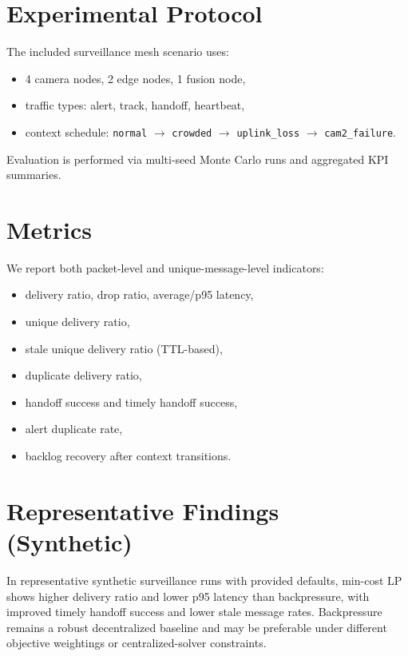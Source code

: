 \documentclass[11pt]{article}
\begin{document}
\section{Experimental Protocol}
The included surveillance mesh scenario uses:
\begin{itemize}[leftmargin=1.5em]
  \item 4 camera nodes, 2 edge nodes, 1 fusion node,
  \item traffic types: alert, track, handoff, heartbeat,
  \item context schedule: \texttt{normal} $\rightarrow$ \texttt{crowded} $\rightarrow$ \texttt{uplink\_loss} $\rightarrow$ \texttt{cam2\_failure}.
\end{itemize}

Evaluation is performed via multi-seed Monte Carlo runs and aggregated KPI summaries.

\section{Metrics}
We report both packet-level and unique-message-level indicators:
\begin{itemize}[leftmargin=1.5em]
  \item delivery ratio, drop ratio, average/p95 latency,
  \item unique delivery ratio,
  \item stale unique delivery ratio (TTL-based),
  \item duplicate delivery ratio,
  \item handoff success and timely handoff success,
  \item alert duplicate rate,
  \item backlog recovery after context transitions.
\end{itemize}

\section{Representative Findings (Synthetic)}
In representative synthetic surveillance runs with provided defaults, min-cost LP shows higher delivery ratio and lower p95 latency than backpressure, with improved timely handoff success and lower stale message rates. Backpressure remains a robust decentralized baseline and may be preferable under different objective weightings or centralized-solver constraints.
\end{document}
